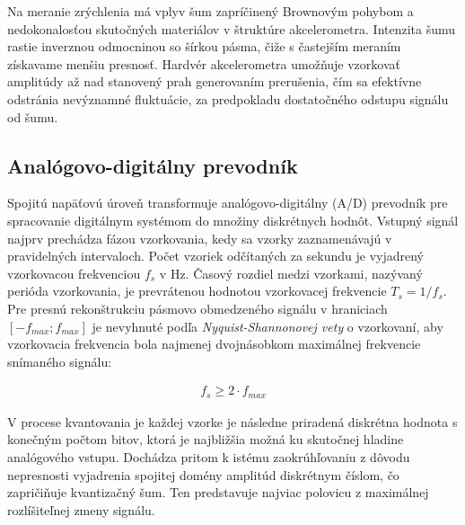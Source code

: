 Na meranie zrýchlenia má vplyv šum zapríčinený Brownovým pohybom a nedokonalosťou skutočných materiálov v štruktúre
akcelerometra. Intenzita šumu rastie inverznou odmocninou so šírkou pásma, čiže s častejším meraním získavame menšiu presnosť. 
Hardvér akcelerometra umožňuje vzorkovať amplitúdy až nad stanovený prah generovaním prerušenia, čím sa efektívne odstránia 
nevýznamné fluktuácie, za predpokladu dostatočného odstupu signálu od šumu.

\subsection{Analógovo-digitálny prevodník}
Spojitú napäťovú úroveň transformuje analógovo-digitálny (A/D) prevodník pre spracovanie digitálnym systémom do množiny diskrétnych
hodnôt. Vstupný signál najprv prechádza fázou vzorkovania, kedy sa vzorky zaznamenávajú v pravidelných intervaloch. Počet vzoriek
odčítaných za sekundu je vyjadrený vzorkovacou frekvenciou $f_s$ v Hz. Časový rozdiel medzi vzorkami, nazývaný perióda vzorkovania,
je prevrátenou hodnotou vzorkovacej frekvencie $T_s = 1 / f_s$. Pre presnú rekonštrukciu pásmovo obmedzeného signálu v hraniciach
$[-f_{max}; f_{max}]$ je nevyhnuté podľa \emph{Nyquist-Shannonovej vety} o vzorkovaní, aby vzorkovacia frekvencia bola najmenej
dvojnásobkom maximálnej frekvencie snímaného signálu:
\begin{ceqn}\begin{align}
   f_s \geq 2 \cdot f_{max}
\end{align}\end{ceqn}

V procese kvantovania je každej vzorke je následne priradená diskrétna hodnota s konečným počtom bitov, ktorá je najbližšia
možná ku skutočnej hladine analógového vstupu. Dochádza pritom k istému zaokrúhľovaniu z dôvodu nepresnosti vyjadrenia spojitej
domény amplitúd diskrétnym číslom, čo zapričiňuje kvantizačný šum. Ten predstavuje najviac polovicu z maximálnej rozlíšiteľnej
zmeny signálu.

